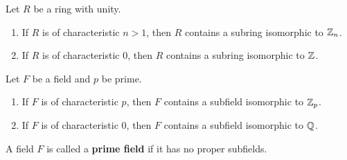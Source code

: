 \begin{corollary} Let $R$ be a ring with unity.
    \begin{enumerate}
        \item If $R$ is of characteristic $n > 1$, then $R$ contains a subring isomorphic to $\mathbb{Z}_n$.
        \item If $R$ is of characteristic 0, then $R$ contains a subring isomorphic to $\mathbb{Z}$.
    \end{enumerate}
\end{corollary}

\begin{corollary}
    Let $F$ be a field and $p$ be prime.
    \begin{enumerate}
        \item If $F$ is of characteristic $p$, then $F$ contains a subfield isomorphic to $\mathbb{Z}_p$.
        \item If $F$ is of characteristic $0$, then $F$ contains a subfield isomorphic to $\mathbb{Q}$.
    \end{enumerate}
\end{corollary}

\begin{definition}
    A field $F$ is called a \textbf{prime field} if it has no proper subfields.
\end{definition}